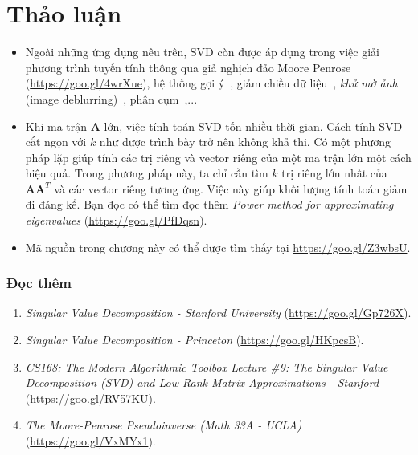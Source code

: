 




\section{Thảo luận}

\begin{itemize}

\item Ngoài những ứng dụng nêu trên, SVD còn được áp dụng trong việc giải phương
trình tuyến tính thông qua giả nghịch đảo Moore Penrose
(\url{https://goo.gl/4wrXue}), hệ thống gợi ý~\cite{sarwar2000application}, giảm chiều dữ liệu~\cite{cybenko1989approximation}, \textit{khử mờ ảnh} (image deblurring)~\cite{hansen2006deblurring},
phân cụm~\cite{drineas2004clustering},...

\item Khi ma trận $\mathbf{A}$ lớn, việc tính toán SVD tốn nhiều thời
gian. Cách tính SVD cắt ngọn với $k$ như được trình bày trở nên không khả thi. Có một phương pháp lặp giúp tính
các trị riêng và vector riêng của một ma trận lớn một cách hiệu quả. Trong phương pháp này, ta
chỉ cần tìm $k$ trị riêng lớn nhất của $\mathbf{AA}^T$ và các vector riêng
tương ứng. Việc này giúp khối lượng tính toán giảm đi đáng kể. Bạn đọc có thể
tìm đọc thêm \textit{Power method for approximating eigenvalues}
(\url{https://goo.gl/PfDqsn}).


\item Mã nguồn trong chương này có thể được tìm thấy tại \url{https://goo.gl/Z3wbsU}.
\end{itemize}




\subsubsection{Đọc thêm}
\begin{enumerate}
\item \textit{Singular Value Decomposition - Stanford University} (\url{https://goo.gl/Gp726X}).

\item \textit{Singular Value Decomposition - Princeton} (\url{https://goo.gl/HKpcsB}).

\item \textit{CS168: The Modern Algorithmic Toolbox Lecture \#9: The Singular
Value Decomposition (SVD) and Low-Rank Matrix Approximations - Stanford}
(\url{https://goo.gl/RV57KU}).

\item \textit{The Moore-Penrose Pseudoinverse (Math 33A - UCLA)} (\url{https://goo.gl/VxMYx1}).
\end{enumerate}
